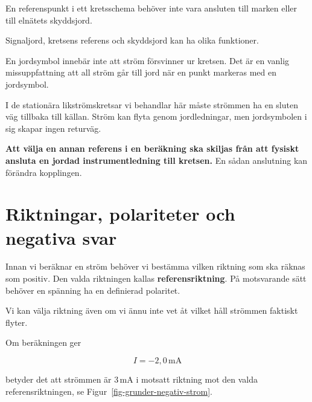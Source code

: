\documentclass[
  swedish,
  11pt,
  a4paper,
  DIV=11,
  numbers=noendperiod,
  twoside,
  open=any]{scrreprt}
\begin{document}
\begin{tcolorbox}[enhanced jigsaw, arc=.35mm, bottomrule=.15mm, bottomtitle=1mm, breakable, colback=white, colbacktitle=quarto-callout-important-color!10!white, colframe=quarto-callout-important-color-frame, coltitle=black, left=2mm, leftrule=.75mm, opacityback=0, opacitybacktitle=0.6, rightrule=.15mm, title=\textcolor{quarto-callout-important-color}{\faExclamation}\hspace{0.5em}{Jord är en referens -- ingen plats där ström försvinner}, titlerule=0mm, toprule=.15mm, toptitle=1mm]

En referenspunkt i ett kretsschema behöver inte vara ansluten till
marken eller till elnätets skyddsjord.

Signaljord, kretsens referens och skyddsjord kan ha olika funktioner.

En jordsymbol innebär inte att ström försvinner ur kretsen. Det är en
vanlig missuppfattning att all ström går till jord när en punkt markeras
med en jordsymbol.

I de stationära likströmskretsar vi behandlar här måste strömmen ha en
sluten väg tillbaka till källan. Ström kan flyta genom jordledningar,
men jordsymbolen i sig skapar ingen returväg.

\end{tcolorbox}

\textbf{Att välja en annan referens i en beräkning ska skiljas från att
fysiskt ansluta en jordad instrumentledning till kretsen.} En sådan
anslutning kan förändra kopplingen.

\section{Riktningar, polariteter och negativa
svar}\label{sec-grunder-riktningar-polariteter-och-negativa-svar}

Innan vi beräknar en ström behöver vi bestämma vilken riktning som ska
räknas som positiv. Den valda riktningen kallas
\textbf{referensriktning}. På motsvarande sätt behöver en spänning ha en
definierad polaritet.

Vi kan välja riktning även om vi ännu inte vet åt vilket håll strömmen
faktiskt flyter.

Om beräkningen ger

\[
I = -2{,}0\,\mathrm{mA}
\]

betyder det att strömmen är \(3\,\mathrm{mA}\) i motsatt riktning mot
den valda referensriktningen, se Figur~\ref{fig-grunder-negativ-strom}.
\end{document}
